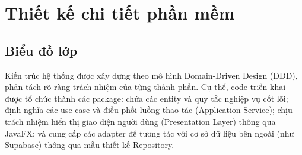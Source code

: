 \chapter{Thiết kế chi tiết phần mềm}

\section{Biểu đồ lớp}

Kiến trúc hệ thống được xây dựng theo mô hình Domain-Driven Design (DDD), phân tách rõ ràng trách nhiệm của từng thành phần. Cụ thể, code triển khai được tổ chức thành các package:  chứa các entity và quy tắc nghiệp vụ cốt lõi;  định nghĩa các use case và điều phối luồng thao tác (Application Service);  chịu trách nhiệm hiển thị giao diện người dùng (Presentation Layer) thông qua JavaFX; và  cung cấp các adapter để tương tác với cơ sở dữ liệu bên ngoài (như Supabase) thông qua mẫu thiết kế Repository.

\subsection{}


\subsection{}


\subsection{}


\subsection{}

